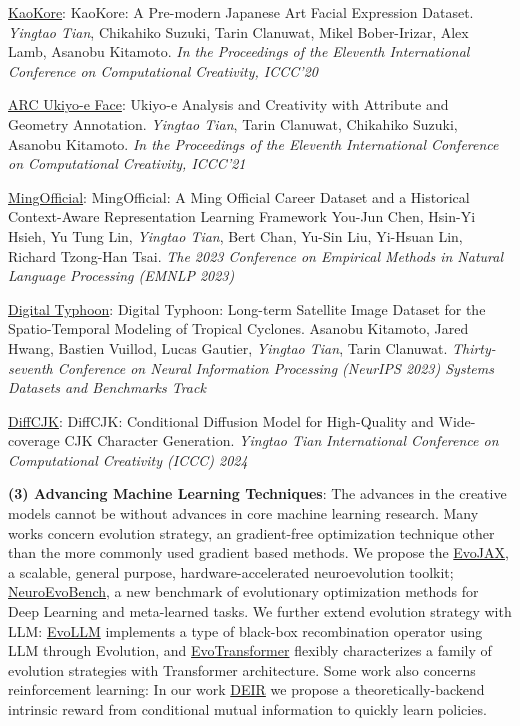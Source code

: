 \documentclass[line,margin]{cv}
\begin{document}
\begin{resume}
  \underline{KaoKore}: {KaoKore: A Pre-modern Japanese Art Facial Expression Dataset}.
  \emph{Yingtao Tian}, Chikahiko Suzuki, Tarin Clanuwat, Mikel Bober-Irizar, Alex Lamb, Asanobu Kitamoto. \emph{In the Proceedings of the Eleventh International Conference on Computational Creativity, ICCC'20}

  \underline{ARC Ukiyo-e Face}: {Ukiyo-e Analysis and Creativity with Attribute and Geometry Annotation}.
  \emph{Yingtao Tian}, Tarin Clanuwat, Chikahiko Suzuki, Asanobu Kitamoto. \emph{In the Proceedings of the Eleventh International Conference on Computational Creativity, ICCC'21}

  \underline{MingOfficial}: {MingOfficial: A Ming Official Career Dataset and a Historical Context-Aware Representation Learning Framework}
  You-Jun Chen, Hsin-Yi Hsieh, Yu Tung Lin, \emph{Yingtao Tian}, Bert Chan, Yu-Sin Liu, Yi-Hsuan Lin, Richard Tzong-Han Tsai. \emph{The 2023 Conference on Empirical Methods in Natural Language Processing (EMNLP 2023)}

  \underline{Digital Typhoon}: {Digital Typhoon: Long-term Satellite Image Dataset for the Spatio-Temporal Modeling of Tropical Cyclones}.
  Asanobu Kitamoto, Jared Hwang, Bastien Vuillod, Lucas Gautier, \emph{Yingtao Tian}, Tarin Clanuwat. \emph{Thirty-seventh Conference on Neural Information Processing (NeurIPS 2023) Systems Datasets and Benchmarks Track}

  \underline{DiffCJK}: {DiffCJK: Conditional Diffusion Model for High-Quality and Wide-coverage CJK Character Generation}.
  \emph{Yingtao Tian} \emph{International Conference on Computational Creativity (ICCC) 2024}

  \textbf{(3) Advancing Machine Learning Techniques}: The advances in the creative models cannot be without advances in core machine learning research.
  Many works concern {evolution strategy}, an gradient-free optimization technique other than the more commonly used gradient based methods. 
  We propose the \underline{EvoJAX}, a scalable, general purpose, hardware-accelerated {neuroevolution toolkit}; \underline{NeuroEvoBench}, a new {benchmark of evolutionary optimization methods} for Deep Learning and meta-learned tasks.  
  We further extend evolution strategy with LLM: \underline{EvoLLM} implements a type of {black-box recombination operator using LLM through Evolution}, and \underline{EvoTransformer} flexibly characterizes a family of {evolution strategies with Transformer architecture}.
  Some work also concerns {reinforcement learning}: In our work \underline{DEIR} we propose a theoretically-backend intrinsic reward from conditional mutual information to quickly learn policies.


\end{resume}
\end{document}
